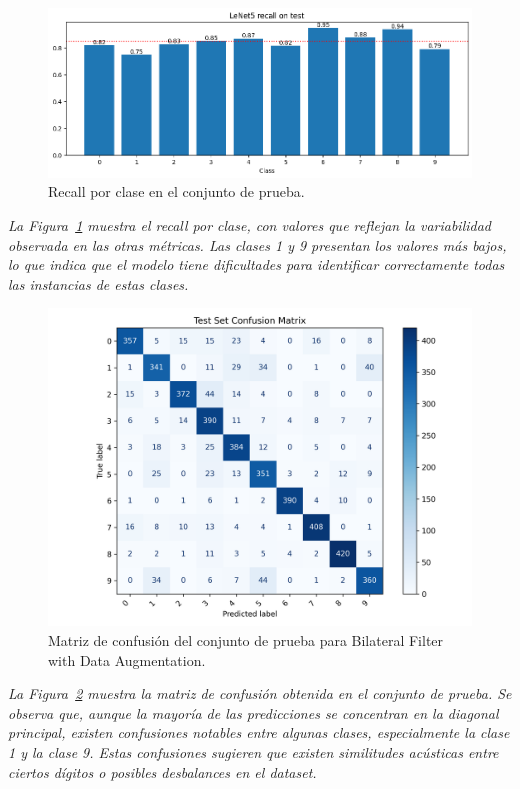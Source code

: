 \documentclass[conference]{IEEEtran}
\begin{document}
\begin{figure}[H]
    \centering
    \includegraphics[width=0.95\linewidth]{graphics-bilateral-da/bilateral-da-recall-test.png}
    \caption{Recall por clase en el conjunto de prueba.}
    \label{fig:bilateral-da-recall-test}
\end{figure}
\noindent\textit{
La Figura~\ref{fig:bilateral-da-recall-test} muestra el recall por clase, con valores que reflejan la variabilidad observada en las otras métricas. Las clases 1 y 9 presentan los valores más bajos, lo que indica que el modelo tiene dificultades para identificar correctamente todas las instancias de estas clases.
}


\begin{figure}[H]
    \centering
    \includegraphics[width=0.95\linewidth]{graphics-bilateral-da/bilateral-da-confusion-matrix.png}
    \caption{Matriz de confusión del conjunto de prueba para Bilateral Filter with Data Augmentation.}
    \label{fig:bilateral-da-confusion-matrix}
\end{figure}
\noindent\textit{
La Figura~\ref{fig:bilateral-da-confusion-matrix} muestra la matriz de confusión obtenida en el conjunto de prueba. Se observa que, aunque la mayoría de las predicciones se concentran en la diagonal principal, existen confusiones notables entre algunas clases, especialmente la clase 1 y la clase 9. Estas confusiones sugieren que existen similitudes acústicas entre ciertos dígitos o posibles desbalances en el dataset.
}
\end{document}
